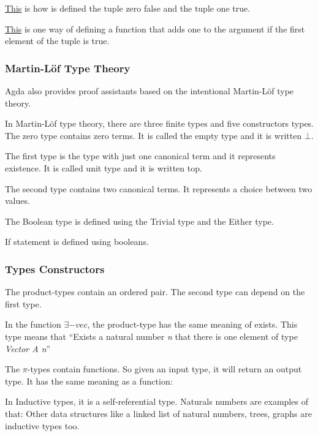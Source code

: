   \hyperref[tupleexamples]{This} is how is defined the tuple zero false and the tuple one true.

  \hyperref[tupleadd]{This} is one way of defining a function that adds one to the argument
  if the first element of the tuple is true.


  \subsubsection{Martin-Löf Type Theory}
  Agda also provides proof assistants based on the intentional Martin-Löf type theory.

    In Martin-Löf type theory, there are three finite types and five constructors types.
    The zero type contains zero terms. It is called the empty type and it is written $\bot$.

    The first type is the type with just one canonical term and it represents existence.
    It is called unit type and it is written top.

    The second type contains two canonical terms. It represents a choice between two values.

    The Boolean type is defined using the Trivial type and the Either type.

    If statement is defined using booleans.


    \subsubsection{Types Constructors}
    The product-types contain an ordered pair.
    The second type can depend on the first type.

    In the function $\exists-vec$, the product-type has the same meaning of exists.
    This type means that
    ``Exists a natural number \emph{n} that there is one element of type \emph{Vector A n}''

    The $\pi$-types contain functions.
    So given an input type, it will return an output type.
    It has the same meaning as a function:

    In Inductive types, it is a self-referential type.
    Naturals numbers are examples of that:
    Other data structures like a linked list of natural numbers, trees, graphs are inductive types too.

